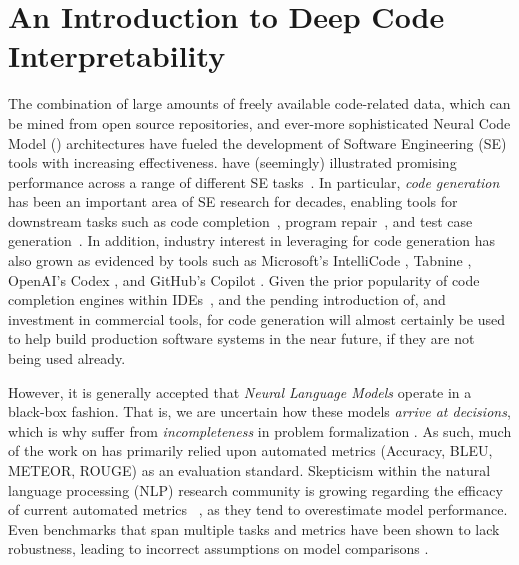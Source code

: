 \chapter{An Introduction to
Deep Code Interpretability}
\label{ch:appII-intro}

The combination of large amounts of freely available code-related data, which can be mined from open source repositories, and ever-more sophisticated Neural Code Model (\nlm) architectures have fueled the development of Software Engineering (SE) tools with increasing effectiveness. \nlms have (seemingly) illustrated promising performance across a range of different SE tasks~\citep{Watson:ICSE20,White:MSR15,ciniselli2021empirical,Mastropaolo2021StudyingTasks}. In particular, \textit{code generation} has been an important area of SE research for decades, enabling tools for downstream tasks such as code completion~\citep{MSR-Completion}, program repair~\citep{Chen2019sequencer}, and test case generation~\citep{Watson:ICSE20}. In addition, industry interest in leveraging \nlms for code generation has also grown as evidenced by tools such as Microsoft's IntelliCode \citep{intellicode}, Tabnine \citep{tabnine}, OpenAI's Codex \citep{openai_codex}, and GitHub's Copilot \citep{github_copilot}. Given the prior popularity of code completion engines within IDEs~\citep{murphy2006ide}, and the pending introduction of, and investment in commercial tools, \nlms for code generation will almost certainly be used to help build production software systems in the near future, if they are not being used already.

However, it is generally accepted that \textit{Neural Language Models} operate in a black-box fashion. That is, we are uncertain how these models \textit{arrive at decisions}, which is why \nlms suffer from \textit{incompleteness} in problem formalization \citep{Doshi-Velez2017TowardsLearning}. As such, much of the work on \nlms has primarily relied upon automated metrics (\eg Accuracy, BLEU, METEOR, ROUGE) as an evaluation standard. Skepticism within the natural language processing (NLP) research community is growing regarding the efficacy of current automated metrics ~\citep{ribeiro2020checklist, rei2020comet, kocmi2021ship}, as they tend to overestimate model performance. Even benchmarks that span multiple tasks and metrics have been shown to lack robustness, leading to incorrect assumptions on model comparisons \citep{dehghani2021benchmark}. 

